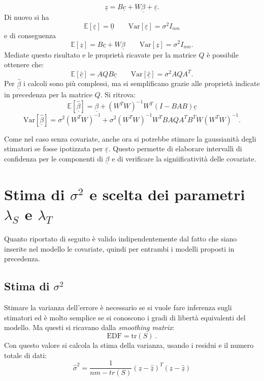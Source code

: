 \documentclass[a4paper,11pt,twoside,openright]{book}							%
\begin{document}
\begin{equation}
\label{eq:modellobasecovarmatric}
\underline z=B \underline c + W \underline \beta + \underline \varepsilon .
\end{equation}
Di nuovo si ha 
$$
\mathbb{E}[\underline \varepsilon] = \underline 0 \qquad \mathrm{Var}[\underline \varepsilon] = \sigma^2 I_{nm}
$$
e di conseguenza
$$
\mathbb{E}[\underline z] = B \underline c + W \underline \beta \qquad \mathrm{Var}[\underline z] = \sigma^2 I_{nm} .
$$
Mediate questo risultato e le proprietà ricavate per la matrice $Q$ è possibile ottenere che:
$$
\mathbb{E}[\hat  {\underline c}] = AQB \underline c \qquad \mathrm{Var}[\hat  {\underline c}] = \sigma^2 AQA^T .
$$
Per $\hat  {\underline \beta}$ i calcoli sono più complessi, ma si semplificano grazie alle proprietà indicate in precedenza per la matrice $Q$. Si ritrova:
$$
\mathbb{E}[\hat  {\underline \beta}] = \underline \beta + (W^TW)^{-1}W^T(I-B AB)\underline c
$$
$$ \mathrm{Var}[\hat  {\underline \beta}] = \sigma^2 (W^TW)^{-1} + \sigma^2 (W^TW)^{-1}W^T B A Q A^T B^T W(W^TW)^{-1}.
$$

Come nel caso senza covariate, anche ora si potrebbe stimare la gaussianità degli stimatori se fosse ipotizzata per $\underline \varepsilon$. Questo permette di elaborare intervalli di confidenza per le componenti di $\underline \beta$ e di verificare la signiificatività delle covariate.


\section{Stima di $\sigma^2$ e scelta dei parametri $\lambda_S$ e $\lambda_T$}
\label{sez:GCV}

Quanto riportato di seguito è valido indipendentemente dal fatto che siano inserite nel modello le covariate, quindi per entrambi i modelli proposti in precedenza.

\subsection{Stima di $\sigma^2$}
Stimare la varianza dell'errore è necessario se si vuole fare inferenza sugli stimatori ed è molto semplice se si conoscono i gradi di libertà equivalenti del modello. Ma questi si ricavano dalla \textit{smoothing matrix}:
$$
\mathrm{EDF}=\mathrm{tr}(S) \ .
$$
Con questo valore si calcola la stima della varianza, usando i residui e il numero totale di dati:
$$
\hat{\sigma}^2=\frac{1}{nm-tr(S)}(\underline z - \hat  {\underline z})^T(\underline z - \hat  {\underline z})
$$
\end{document}
